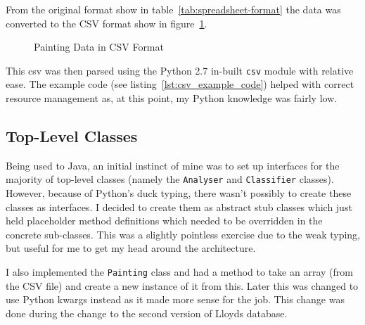 From the original format show in table~\ref{tab:spreadsheet-format} 
the data was converted to the CSV format show
in figure~\ref{fig:csv-spreadsheet}.

\begin{table}[h]
\caption{Layout of the Painting Data Spreadsheet}\label{tab:spreadsheet-format}
\end{table}

\begin{figure}[h]
\caption{Painting Data in CSV Format}\label{fig:csv-spreadsheet}
\end{figure}

This \gls{csv} was then parsed using the Python 2.7 in-built \texttt{csv} module with relative 
ease. The example code (see listing~\ref{lst:csv_example_code}) helped with correct resource 
management as, at this point, my Python knowledge was fairly low.


\subsection{Top-Level Classes}
Being used to Java, an initial instinct of mine was to set up interfaces for the majority of 
top-level classes (namely the \texttt{Analyser} and \texttt{Classifier} classes). However, 
because of Python's duck typing, there wasn't possibly to create these classes as interfaces. I 
decided to create them as abstract stub classes which just held placeholder method definitions 
which needed to be overridden in the concrete sub-classes. This was a slightly pointless exercise 
due to the weak typing, but useful for me to get my head around the architecture.

I also implemented the \texttt{Painting} class and had a method to take an array (from the CSV 
file) and create a new instance of it from this. Later this was changed to use Python 
\gls{kwargs} instead as it made more sense for the job. This change was done during the change to 
the second version of Lloyds database.


